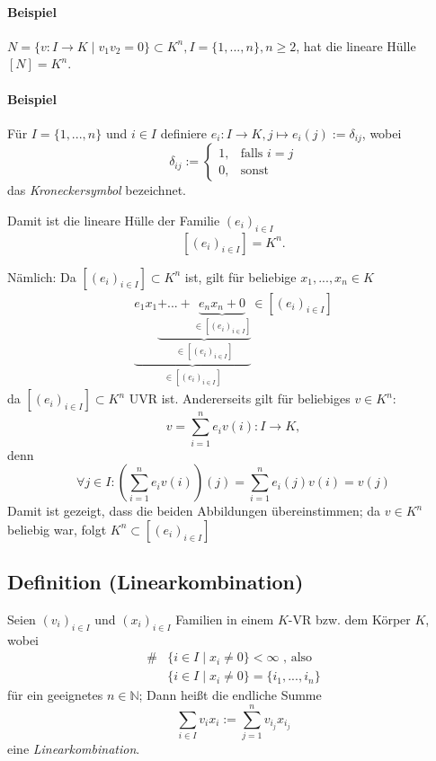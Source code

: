 \paragraph{Beispiel}
	$N=\{v:I\to K\mid v_1v_2=0\} \subset K^n,I=\{1,...,n\},n\geq 2$, hat die lineare Hülle $[N]=K^n$.

\paragraph{Beispiel}
	Für $I=\{1,...,n\}$ und $i\in I$ definiere
	$e_i:I\to K , j\mapsto e_i(j):= \delta_{ij}$, wobei 
	\begin{equation*}
		\delta_{ij} :=
		\begin{cases}
			1,& \text{falls }i=j\\
			0,& \text{sonst}
		\end{cases}
	\end{equation*}
	das \emph{Kroneckersymbol} bezeichnet.
	
	Damit ist die lineare Hülle der Familie $(e_i)_{i\in I}$
		\[ [(e_i)_{i\in I}] = K^n. \]
	
	Nämlich: Da $[(e_i)_{i\in I}]\subset K^n$ ist, gilt für beliebige $x_1,...,x_n\in K$
	\begin{gather*}
		\underbrace{e_1x_1\underbrace{+...+\underbrace{e_nx_n + 0}_{\in [(e_i)_{i\in I}]}}_{\in [(e_i)_{i\in I}]}}_{\in [(e_i)_{i\in I}]}\in [(e_i)_{i\in I}]
	\end{gather*}
	da $[(e_i)_{i\in I}] \subset K^n$ UVR ist. 
	Andererseits gilt für beliebiges $v\in K^n$:
		\[ v=\sum^n_{i=1}e_iv(i): I\to K, \]	
	denn
		\[ \forall j\in I: \left(\sum^n_{i=1} e_iv(i)\right)(j) = \sum^n_{i=1}e_i(j)v(i) = v(j) \]
	Damit ist gezeigt, dass die beiden Abbildungen übereinstimmen; da $v\in K^n$ beliebig war, folgt $K^n \subset [(e_i)_{i\in I}]$
	
\subsection{Definition (Linearkombination)}
	\begin{Definition}
		Seien $(v_i)_{i\in I}$ und $(x_i)_{i\in I}$ Familien in einem $ K $-VR bzw. dem Körper $ K $, wobei
	\begin{align*}
		\# &\{i\in I\mid x_i \neq 0\} < \infty\text{ , also}\\
		   &\{i\in I \mid x_i \neq 0\} = \{i_1,...,i_n\}
        \end{align*}
        für ein geeignetes  $n\in \mathbb{N}$;
    	Dann heißt die endliche Summe
            \[\sum_{i\in I} v_ix_i:= \sum^n_{j=1}v_{i_j}x_{i_j}\]
        eine \emph{Linearkombination}.
	\end{Definition}
	
